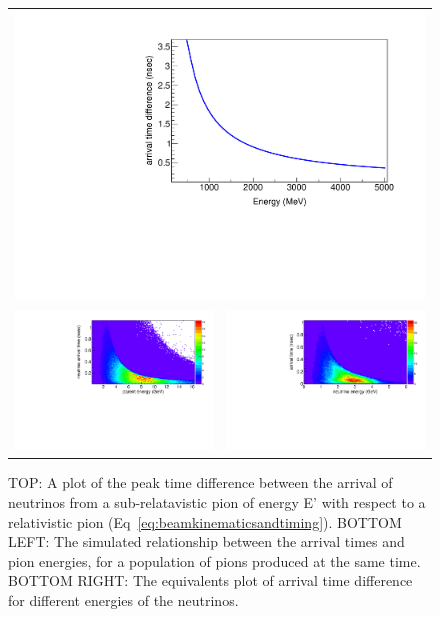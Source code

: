 \documentclass[preprint,12pt]{elsarticle}
\begin{document}
\begin{figure}[t]
	\begin{center}
           	\begin{tabular}{c c}
           	\multicolumn{2}{c}{\includegraphics[width=0.5 \linewidth]{Figures/2018.12.3_kinematics/deltaTvsE.pdf}}\\
           	\includegraphics[width=0.49 \linewidth]{Figures/2018.10.14_LBNFtiming/parentEvsdT.pdf} &
			\includegraphics[width=0.49 \linewidth]{Figures/2018.10.14_LBNFtiming/nuEvsdT.pdf} \\
			\end{tabular}
	\end{center}
	\caption{TOP: A plot of the peak time difference between the arrival of neutrinos from a sub-relatavistic pion of energy E' with respect to a relativistic pion (Eq~\ref{eq:beamkinematicsandtiming}). BOTTOM LEFT: The simulated relationship between the arrival times and pion energies, for a population of pions produced at the same time. BOTTOM RIGHT: The equivalents plot of arrival time difference for different energies of the neutrinos.}
		\label{fig:beamkinematicsandtiming}
\end{figure}
\end{document}
